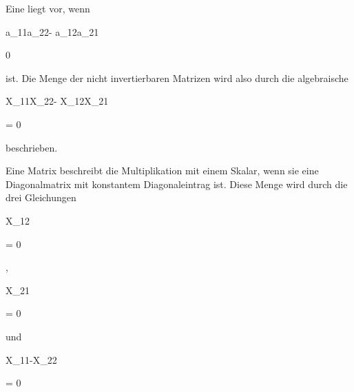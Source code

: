 {


Eine
liegt vor, wenn


\mavergleichskette


{\vergleichskette


{ a_{11}a_{22}- a_{12}a_{21}
}


{ \neq }{ 0
}


{  }{
}


{    }{
}


{   }{
}


}
{}{}{}
ist. Die Menge der nicht invertierbaren Matrizen wird also durch die algebraische  {}


\mavergleichskette


{\vergleichskette


{ X_{11}X_{22}- X_{12}X_{21}
}


{ = }{ 0
}


{  }{
}


{    }{
}


{   }{
}


}
{}{}{}
beschrieben.


Eine Matrix beschreibt die Multiplikation mit einem Skalar, wenn sie eine Diagonalmatrix mit konstantem Diagonaleintrag ist. Diese Menge wird durch die drei Gleichungen


\mavergleichskette


{\vergleichskette


{  X_{12}
}


{ = }{ 0
}


{  }{
}


{    }{
}


{   }{
}


}
{}{}{,}


\mavergleichskette


{\vergleichskette


{  X_{21}
}


{ = }{ 0
}


{  }{
}


{    }{
}


{   }{
}


}
{}{}{}
und


\mavergleichskette


{\vergleichskette


{ X_{11}-X_{22}
}


{ = }{ 0
}


{  }{
}


{    }{
}


}}
